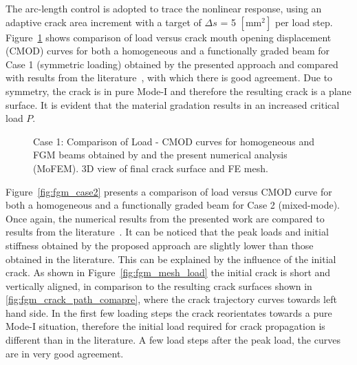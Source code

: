 \documentclass[onecolumn]{svjour3}
\begin{document}
The arc-length control is adopted to trace the nonlinear response, using an adaptive crack area increment with a target of $\Delta s$ = 5 $[\mathrm{mm}^2]$ per load step. Figure~\ref{fig:fgm_case1} shows comparison of load versus crack mouth opening displacement (CMOD) curves for both a homogeneous and a functionally graded beam for Case 1 (symmetric loading) obtained by the presented approach and compared with results from the literature~\citep{kim2004simulation}, with which there is good agreement. Due to symmetry, the crack is in pure Mode-I and therefore the resulting crack is a plane surface. It is evident that the material gradation results in an increased critical load $P$. 
% 
% 
\begin{figure}
	\centering
	\caption{Case 1: Comparison of Load - CMOD curves for homogeneous and FGM beams obtained by \citep{kim2004simulation} and the present numerical analysis (MoFEM). 3D view of final crack surface and FE mesh.}
	\label{fig:fgm_case1}
\end{figure}
% 
% 
Figure~\ref{fig:fgm_case2} presents a comparison of load versus CMOD curve for both a homogeneous and a functionally graded beam for Case 2 (mixed-mode). Once again, the numerical results from the presented work are compared to results from the literature~\citep{kim2004simulation}. It can be noticed that the peak loads and initial stiffness obtained by the proposed approach are slightly lower than those obtained in the literature. This can be explained by the influence of the initial crack. As shown in Figure~\ref{fig:fgm_mesh_load} the initial crack is short and vertically aligned, in comparison to the resulting crack surfaces shown in \ref{fig:fgm_crack_path_comapre}, where the crack trajectory curves towards left hand side. In the first few loading steps the crack reorientates towards a pure Mode-I situation, therefore the initial load required for crack propagation is different than in the literature. A few load steps after the peak load, the curves are in very good agreement. 
\end{document}
